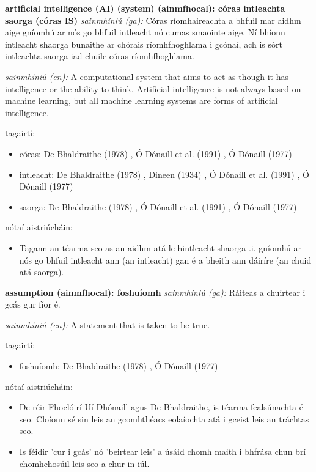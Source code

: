 \documentclass{article}
\begin{document}
\textbf{artificial intelligence (AI) (system) (ainmfhocal): córas intleachta saorga (córas IS)}
\textit{sainmhíniú (ga):} Córas ríomhaireachta a bhfuil mar aidhm aige gníomhú ar nós go bhfuil intleacht nó cumas smaointe aige. Ní bhíonn intleacht shaorga bunaithe ar chórais ríomhfhoghlama i gcónaí, ach is sórt intleachta saorga iad chuile córas ríomhfhoghlama.

\textit{sainmhíniú (en):} A computational system that aims to act as though it has intelligence or the ability to think. Artificial intelligence is not always based on machine learning, but all machine learning systems are forms of artificial intelligence.

tagairtí:
\begin{itemize}
	\item córas: De Bhaldraithe (1978) \cite{de-bhaldraithe}, Ó Dónaill et al. (1991) \cite{focloir-beag}, Ó Dónaill (1977) \cite{odonaill}
	\item intleacht: De Bhaldraithe (1978) \cite{de-bhaldraithe}, Dineen (1934) \cite{dineen}, Ó Dónaill et al. (1991) \cite{focloir-beag}, Ó Dónaill (1977) \cite{odonaill}
	\item saorga: De Bhaldraithe (1978) \cite{de-bhaldraithe}, Ó Dónaill et al. (1991) \cite{focloir-beag}, Ó Dónaill (1977) \cite{odonaill}
\end{itemize}

nótaí aistriúcháin:
\begin{itemize}
	\item Tagann an téarma seo as an aidhm atá le hintleacht shaorga .i. gníomhú ar nós go bhfuil intleacht ann (an intleacht) gan é a bheith ann dáiríre (an chuid atá saorga).
\end{itemize}


\textbf{assumption (ainmfhocal): foshuíomh}
\textit{sainmhíniú (ga):} Ráiteas a chuirtear i gcás gur fíor é.

\textit{sainmhíniú (en):} A statement that is taken to be true.

tagairtí:
\begin{itemize}
	\item foshuíomh: De Bhaldraithe (1978) \cite{de-bhaldraithe}, Ó Dónaill (1977) \cite{odonaill}
\end{itemize}

nótaí aistriúcháin:
\begin{itemize}
	\item De réir Fhoclóirí Uí Dhónaill agus De Bhaldraithe, is téarma fealsúnachta é seo. Cloíonn sé sin leis an gcomhthéacs eolaíochta atá i gceist leis an tráchtas seo.
	\item Is féidir 'cur i gcás' nó 'beirtear leis' a úsáid chomh maith i bhfrása chun brí chomhchosúil leis seo a chur in iúl.
\end{itemize}
\end{document}
